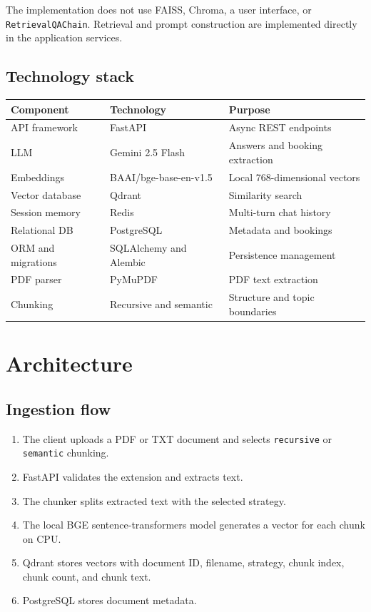 \documentclass[12pt, a4paper]{article}
\begin{document}
The implementation does not use FAISS, Chroma, a user interface, or
\texttt{RetrievalQAChain}. Retrieval and prompt construction are implemented
directly in the application services.

\subsection{Technology stack}

\begin{center}
\begin{tabularx}{\textwidth}{L{3.4cm} L{4.8cm} Y}
    \toprule
    \textbf{Component} & \textbf{Technology} & \textbf{Purpose} \\
    \midrule
    API framework     & FastAPI                 & Async REST endpoints \\
    LLM               & Gemini 2.5 Flash        & Answers and booking extraction \\
    Embeddings        & BAAI/bge-base-en-v1.5   & Local 768-dimensional vectors \\
    Vector database   & Qdrant                  & Similarity search \\
    Session memory    & Redis                   & Multi-turn chat history \\
    Relational DB     & PostgreSQL              & Metadata and bookings \\
    ORM and migrations& SQLAlchemy and Alembic  & Persistence management \\
    PDF parser        & PyMuPDF                 & PDF text extraction \\
    Chunking          & Recursive and semantic  & Structure and topic boundaries \\
    \bottomrule
\end{tabularx}
\end{center}

\section{Architecture}

\subsection{Ingestion flow}

\begin{enumerate}[leftmargin=1.5em]
    \item The client uploads a PDF or TXT document and selects
    \texttt{recursive} or \texttt{semantic} chunking.
    \item FastAPI validates the extension and extracts text.
    \item The chunker splits extracted text with the selected strategy.
    \item The local BGE sentence-transformers model generates a vector for each
    chunk on CPU.
    \item Qdrant stores vectors with document ID, filename, strategy, chunk
    index, chunk count, and chunk text.
    \item PostgreSQL stores document metadata.
\end{enumerate}
\end{document}
